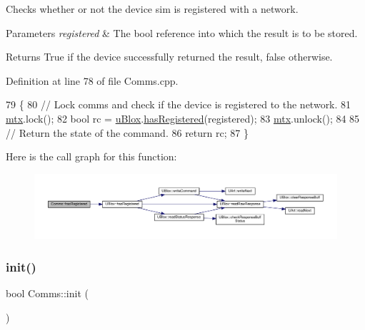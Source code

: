 Checks whether or not the device sim is registered with a network.


\begin{DoxyParams}{Parameters}
{\em registered} & The bool reference into which the result is to be stored. \\
\hline
\end{DoxyParams}
\begin{DoxyReturn}{Returns}
True if the device successfully returned the result, false otherwise. 
\end{DoxyReturn}


Definition at line 78 of file Comms.\+cpp.


\begin{DoxyCode}
79 \{
80     \textcolor{comment}{// Lock comms and check if the device is registered to the network.}
81     \hyperlink{class_comms_a21df861b1202573e4cd0cb5666d638fe}{mtx}.lock();
82     \textcolor{keywordtype}{bool} rc = \hyperlink{class_comms_ac64dea134b116147e5441172346dbd6c}{uBlox}.\hyperlink{class_u_blox_a1889c2b9bb6087bc939bd2a27b68623b}{hasRegistered}(registered);
83     \hyperlink{class_comms_a21df861b1202573e4cd0cb5666d638fe}{mtx}.unlock();
84 
85     \textcolor{comment}{// Return the state of the command.}
86     \textcolor{keywordflow}{return} rc;
87 \}
\end{DoxyCode}
Here is the call graph for this function\+:
\nopagebreak
\begin{figure}[H]
\begin{center}
\leavevmode
\includegraphics[width=350pt]{d8/dcc/class_comms_ae1fb7ac11bd07f21134335aec55bd833_cgraph}
\end{center}
\end{figure}
\mbox{\label{class_comms_aa0519d3ed2d5bd6aad60101080ac2de7}} 
\subsubsection{\texorpdfstring{init()}{init()}}
{\footnotesize\ttfamily bool Comms\+::init (\begin{DoxyParamCaption}{ }\end{DoxyParamCaption})}

